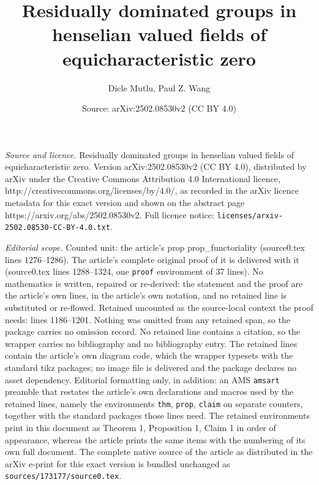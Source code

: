 \documentclass[10pt,a4paper]{amsart}
\title{Residually dominated groups in henselian valued fields of equicharacteristic zero}
\author{Dicle Mutlu, Paul Z. Wang}
\date{Source: arXiv:2502.08530v2 (CC BY 4.0)}
\begin{document}
\maketitle

\noindent\emph{Source and licence.} Residually dominated groups in henselian valued fields of equicharacteristic zero. Version arXiv:2502.08530v2 (CC BY 4.0), distributed by arXiv under the Creative Commons Attribution 4.0 International licence, http://creativecommons.org/licenses/by/4.0/, as recorded in the arXiv licence metadata for this exact version and shown on the abstract page https://arxiv.org/abs/2502.08530v2. Full licence notice: \texttt{licenses/arxiv-2502.08530-CC-BY-4.0.txt}.\par\smallskip

\noindent\textit{Editorial scope.} Counted unit: the article's prop prop\_functoriality (source0.tex lines 1276--1286). The article's complete original proof of it is delivered with it (source0.tex lines 1288--1324, one \texttt{proof} environment of 37 lines). No mathematics is written, repaired or re-derived: the statement and the proof are the article's own lines, in the article's own notation, and no retained line is substituted or re-flowed.  Retained uncounted as the source-local context the proof needs: lines 1186--1201.  Nothing was omitted from any retained span, so the package carries no omission record.  No retained line contains a citation, so the wrapper carries no bibliography and no bibliography entry.  The retained lines contain the article's own diagram code, which the wrapper typesets with the standard tikz packages; no image file is delivered and the package declares no asset dependency.  Editorial formatting only, in addition: an AMS \texttt{amsart} preamble that restates the article's own declarations and macros used by the retained lines, namely the environments \texttt{thm}, \texttt{prop}, \texttt{claim} on separate counters, together with the standard packages those lines need.  The retained environments print in this document as Theorem 1, Proposition 1, Claim 1 in order of appearance, whereas the article prints the same items with the numbering of its own full document.  The complete native source of the article as distributed in the arXiv e-print for this exact version is bundled unchanged as \texttt{sources/173177/source0.tex}.
\end{document}
